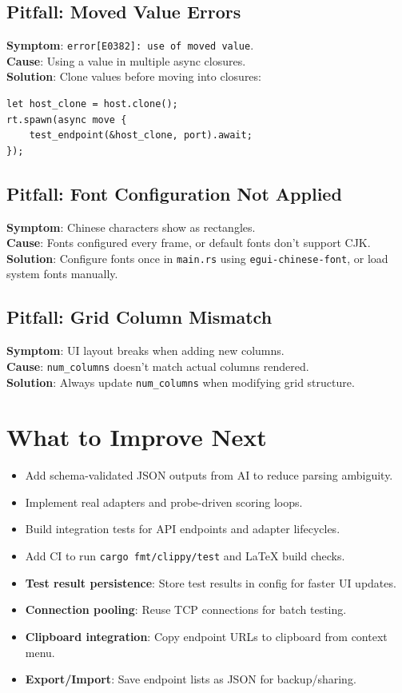 \subsection{Pitfall: Moved Value Errors}
\textbf{Symptom}: \texttt{error[E0382]: use of moved value}.\\
\textbf{Cause}: Using a value in multiple async closures.\\
\textbf{Solution}: Clone values before moving into closures:
\begin{verbatim}
let host_clone = host.clone();
rt.spawn(async move {
    test_endpoint(&host_clone, port).await;
});
\end{verbatim}

\subsection{Pitfall: Font Configuration Not Applied}
\textbf{Symptom}: Chinese characters show as rectangles.\\
\textbf{Cause}: Fonts configured every frame, or default fonts don't support CJK.\\
\textbf{Solution}: Configure fonts once in \texttt{main.rs} using \texttt{egui-chinese-font}, or load system fonts manually.

\subsection{Pitfall: Grid Column Mismatch}
\textbf{Symptom}: UI layout breaks when adding new columns.\\
\textbf{Cause}: \texttt{num\_columns} doesn't match actual columns rendered.\\
\textbf{Solution}: Always update \texttt{num\_columns} when modifying grid structure.

\section{What to Improve Next}
\begin{itemize}
    \item Add schema-validated JSON outputs from AI to reduce parsing ambiguity.
    \item Implement real adapters and probe-driven scoring loops.
    \item Build integration tests for API endpoints and adapter lifecycles.
    \item Add CI to run \texttt{cargo fmt/clippy/test} and LaTeX build checks.
    \item \textbf{Test result persistence}: Store test results in config for faster UI updates.
    \item \textbf{Connection pooling}: Reuse TCP connections for batch testing.
    \item \textbf{Clipboard integration}: Copy endpoint URLs to clipboard from context menu.
    \item \textbf{Export/Import}: Save endpoint lists as JSON for backup/sharing.
\end{itemize}

